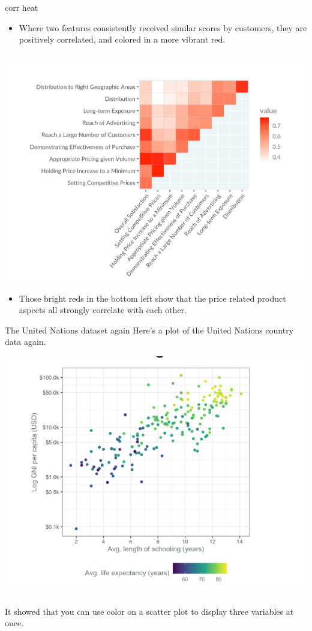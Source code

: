 \documentclass[
  ignorenonframetext,
]{beamer}
\providecommand{\tightlist}{%
  \setlength{\itemsep}{0pt}\setlength{\parskip}{0pt}}
\begin{document}
\begin{frame}{corr heat}
\label{corr-heat-1}
\begin{itemize}
\tightlist
\item
  Where two features consistently received similar scores by customers,
  they are positively correlated, and colored in a more vibrant red.
\end{itemize}

\includegraphics{../images/im96.png}

\begin{itemize}
\tightlist
\item
  Those bright reds in the bottom left show that the price related
  product aspects all strongly correlate with each other.
\end{itemize}
\end{frame}

\begin{frame}{The United Nations dataset again}
\label{the-united-nations-dataset-again}
Here's a plot of the United Nations country data again.

\includegraphics{../images/im97.png}

It showed that you can use color on a scatter plot to display three
variables at once.
\end{frame}
\end{document}
